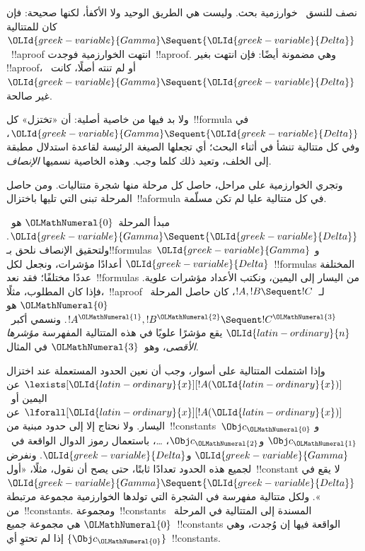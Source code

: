 \documentclass[../../../include/open-logic-section]{subfiles}
\begin{document}


نصف للنسق~ خوارزمية بحث. وليست هي الطريق الوحيد ولا الأكفأ،
لكنها صحيحة: فإن كان للمتتالية~${\OLId{greek-variable}{Gamma}}\Sequent{\OLId{greek-variable}{Delta}}$~!!a{proof} انتهت
الخوارزمية فوجدت~!!a{proof}. وهي مضمونة أيضًا: فإن انتهت بغير
!!a{proof}، أو لم تنته أصلًا، كانت~${\OLId{greek-variable}{Gamma}}\Sequent{\OLId{greek-variable}{Delta}}$ غير صالحة.

ولا بد فيها من خاصية أصلية: أن «تختزل» كل~!!{formula} في
${\OLId{greek-variable}{Gamma}}\Sequent{\OLId{greek-variable}{Delta}}$، وفي كل متتالية تنشأ في أثناء البحث؛ أي تجعلها
الصيغة الرئيسة لقاعدة استدلال مطبقة إلى الخلف، وتعيد ذلك كلما وجب. وهذه
الخاصية نسميها \emph{الإنصاف}.

وتجري الخوارزمية على مراحل، حاصل كل مرحلة منها شجرة متتاليات. ومن حاصل
المرحلة تبنى التي تليها باختزال~!!a{formula} في كل متتالية عليا لم تكن
مسلّمة.

مبدأ المرحلة~${\OLMathNumeral{0}}$ هو~${\OLId{greek-variable}{Gamma}}\Sequent{\OLId{greek-variable}{Delta}}$. ولتحقيق الإنصاف نلحق
بـ!!{formula}s~${\OLId{greek-variable}{Gamma}}$ و${\OLId{greek-variable}{Delta}}$ أعدادًا مؤشرات، ونجعل لكل~!!{formula}s
المختلفة عددًا مختلفًا؛ فقد نعد~!!{formula}s من اليسار إلى اليمين، ونكتب
الأعداد مؤشرات علوية. فإذا كان المطلوب، مثلًا،~!!a{proof}
لـ~$!A,!B\Sequent !C$، كان حاصل المرحلة~${\OLMathNumeral{0}}$ هو
$!A^{\OLMathNumeral{1}},!B^{\OLMathNumeral{2}}\Sequent !C^{\OLMathNumeral{3}}$. ونسمي أكبر~${\OLId{latin-ordinary}{n}}$ يقع مؤشرًا علويًا في هذه
المتتالية المفهرسة \emph{مؤشرها الأقصى}، وهو~${\OLMathNumeral{3}}$ في المثال.

وإذا اشتملت المتتالية على أسوار، وجب أن نعين الحدود المستعملة عند اختزال
$\lexists[{\OLId{latin-ordinary}{x}}][!A({\OLId{latin-ordinary}{x}})]$ عن اليمين أو~$\lforall[{\OLId{latin-ordinary}{x}}][!A({\OLId{latin-ordinary}{x}})]$ عن اليسار.
ولا نحتاج إلا إلى حدود مبنية من~!!{constant}s~$\Obj c_{\OLMathNumeral{0}}$ و
$\Obj c_{\OLMathNumeral{1}}$ و$\Obj c_{\OLMathNumeral{2}}$، \dots، باستعمال رموز الدوال الواقعة في~${\OLId{greek-variable}{Gamma}}$
و${\OLId{greek-variable}{Delta}}$. ونفرض لجميع هذه الحدود تعدادًا ثابتًا، حتى يصح أن نقول، مثلًا،
«أول~!!{constant} لا يقع في
${\OLId{greek-variable}{Gamma}}\Sequent{\OLId{greek-variable}{Delta}}$». ولكل متتالية مفهرسة في الشجرة التي تولدها
الخوارزمية مجموعة مرتبطة من~!!{constant}s. ومجموعة~!!{constant}s المسندة إلى المتتالية
في المرحلة~${\OLMathNumeral{0}}$ هي مجموعة جميع~!!{constant}s الواقعة فيها إن وُجدت، وهي
$\{\Obj c_{\OLMathNumeral{0}}\}$ إذا لم تحتوِ أي~!!{constant}s.
\end{document}
